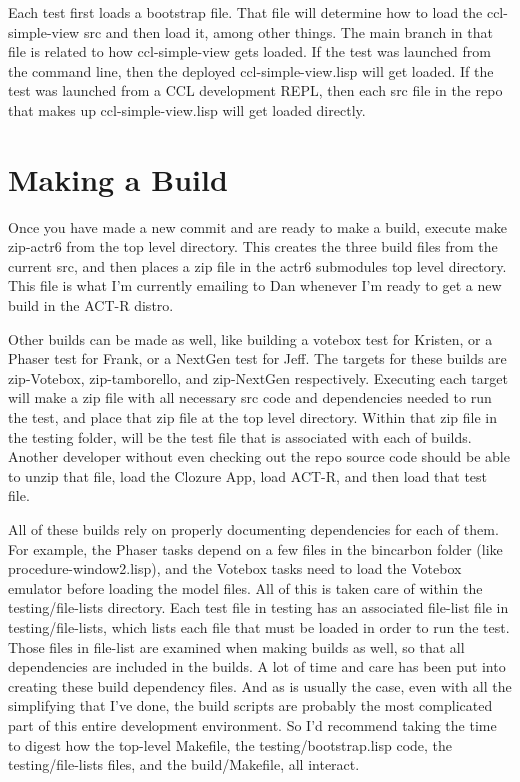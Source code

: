 \documentclass[12pt]{article} %
\begin{document}
Each test first loads a bootstrap file.
That file will determine how to load the ccl-simple-view src and then load it, among other things.
The main branch in that file is related to how ccl-simple-view gets loaded.
If the test was launched from the command line, then the deployed ccl-simple-view.lisp will get loaded.
If the test was launched from a CCL development REPL, then each src file in the repo that makes up ccl-simple-view.lisp will get loaded directly.

\section{Making a Build}

Once you have made a new commit and are ready to make a build, execute make zip-actr6 from the top level directory.
This creates the three build files from the current src, and then places a zip file in the actr6 submodules top level directory.
This file is what I'm currently emailing to Dan whenever I'm ready to get a new build in the ACT-R distro.

Other builds can be made as well, like building a votebox test for Kristen, or a Phaser test for Frank, or a NextGen test for Jeff.
The targets for these builds are zip-Votebox, zip-tamborello, and zip-NextGen respectively.
Executing each target will make a zip file with all necessary src code and dependencies needed to run the test, and place that zip file at the top level directory.
Within that zip file in the testing folder, will be the test file that is associated with each of builds. 
Another developer without even checking out the repo source code should be able to unzip that file, load the Clozure App, load ACT-R, and then load that test file.

All of these builds rely on properly documenting dependencies for each of them.
For example, the Phaser tasks depend on a few files in the bincarbon folder (like procedure-window2.lisp),
and the Votebox tasks need to load the Votebox emulator before loading the model files.
All of this is taken care of within the testing/file-lists directory.
Each test file in testing has an associated file-list file in testing/file-lists, which lists each file that must be loaded in order to run the test.
Those files in file-list are examined when making builds as well, so that all dependencies are included in the builds.
A lot of time and care has been put into creating these build dependency files.
And as is usually the case, even with all the simplifying that I've done, the build scripts are probably the most complicated part of this entire development environment.
So I'd recommend taking the time to digest how the top-level Makefile, the testing/bootstrap.lisp code, the testing/file-lists files, and the build/Makefile, all interact.
\end{document}
